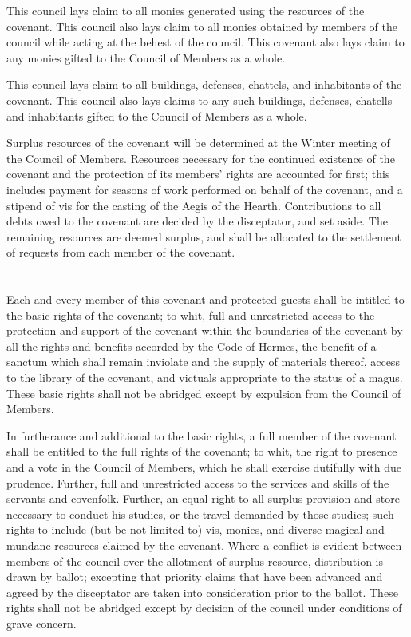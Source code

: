 \documentclass [a3paper,portrait,20pt]{article}
\begin{document}
\begin{multicols}{2}
\begin{small}
	This council lays claim to all monies generated using the resources of the covenant. This council also
	lays claim to all monies obtained by members of the council while acting at the behest of the council.
	This covenant also lays claim to any monies gifted to the Council of Members as a whole.
	
	This council lays claim to all buildings, defenses, chattels, and inhabitants of the covenant. This
	council also lays claims to any such buildings, defenses, chatells and inhabitants gifted to the
	Council of Members as a whole.
	
	Surplus resources of the covenant will be determined at the Winter meeting of the Council of Members.
	Resources necessary for the continued existence of the covenant and the protection of its members'
	rights are accounted for first; this includes payment for seasons of work performed on behalf of the
	covenant, and a stipend of vis for the casting of the Aegis of the Hearth. Contributions to all debts
	owed to the covenant are decided by the disceptator, and set aside. The remaining resources are deemed
	surplus, and shall be allocated to the settlement of requests from each member of the covenant.
	
\section*{\fontsize{35}{40}\selectfont{Rights of the Members of this Covenant}}
	Each and every member of this covenant and protected guests shall be intitled to the basic rights of
	the covenant; to whit, full and unrestricted access to the protection and support of the covenant within
	the boundaries of the covenant by all the rights and benefits accorded by the Code of Hermes, the
	benefit of a sanctum which shall remain inviolate and the supply of materials thereof, access to the
	library of the covenant, and victuals appropriate to the status of a magus. These basic rights shall not
	be abridged except by expulsion from the Council of Members.
	
	In furtherance and additional to the basic rights, a full member of the covenant shall be entitled to
	the full rights of the covenant; to whit, the right to presence and a vote in the Council of Members,
	which he shall exercise dutifully with due prudence. Further, full and unrestricted access to the
	services and skills of the servants and covenfolk. Further, an equal right to all surplus provision and
	store necessary to conduct his studies, or the travel demanded by those studies; such rights to include
	(but be not limited to) vis, monies, and diverse magical and mundane resources claimed by the covenant.
	Where a conflict is evident between members of the council over the allotment of surplus resource,
	distribution is drawn by ballot; excepting that priority claims that have been advanced and agreed by
	the disceptator are taken into consideration prior to the ballot. These rights shall not be abridged
	except by decision of the council under conditions of grave concern.
	

\end{small}
\end{multicols}
\end{document}
